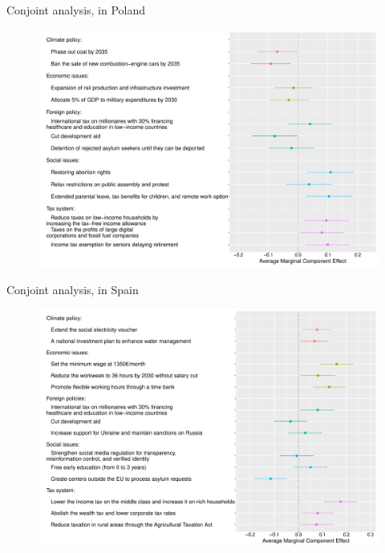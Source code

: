 \documentclass[aspectratio=169,xcolor=dvipsnames, 11pt,mathserif]{beamer}
\begin{document}
\begin{frame}{Conjoint analysis,  in Poland\label{conjoint_countries} \hyperlink{conjoint_country}{}} 
    \begin{figure} \vspace{-.14cm}
\includegraphics[height=.97\textheight]{../figures/all/conjoint_EN-PL.pdf}
\end{figure}
\end{frame}

\begin{frame}{Conjoint analysis,  in Spain\label{conjoint_countries} \hyperlink{conjoint_country}{}} 
    \begin{figure} \vspace{-.14cm}
\includegraphics[height=.97\textheight]{../figures/all/conjoint_EN-ES.pdf}
\end{figure}
\end{frame}
\end{document}
